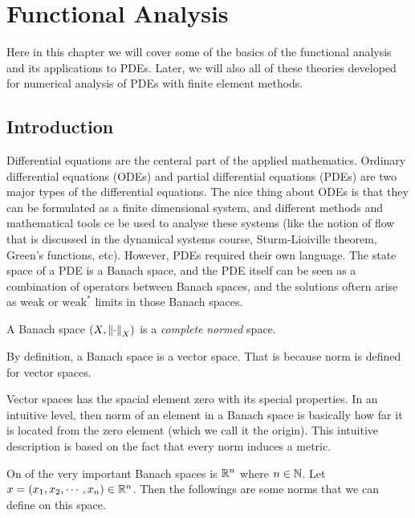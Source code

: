 
\chapter{Functional Analysis}

Here in this chapter we will cover some of the basics of the functional analysis and its applications to PDEs. Later, we will also all of these theories developed for numerical analysis of PDEs with finite element methods.



\section{Introduction}
Differential equations are the centeral part of the applied mathematics. Ordinary differential equations (ODEs) and partial differential equations (PDEs) are two major types of the differential equations. The nice thing about ODEs is that they can be formulated as a finite dimensional system, and different methods and mathematical tools ce be used to analyse these systems (like the notion of flow that is discussed in the dynamical systems course, Sturm-Lioiville theorem, Green's functions, etc). However, PDEs required their own language. The state space of a PDE is a Banach space, and the PDE itself can be seen as a combination of operators between Banach spaces, and the solutions oftern arise as weak or $ \text{weak}^* $ limits in those Banach spaces. 

\begin{definition}
  A Banach space $ (X, \norm{\cdot}_X) $ is a \emph{complete} \emph{normed} space.
\end{definition}

\begin{remark}
  By definition, a Banach space is a vector space. That is because norm is defined for vector spaces.
\end{remark}

\begin{remark}
  Vector spaces has the spacial element zero with its special properties. In an intuitive level, then norm of an element in a Banach space is basically how far it is located from the zero element (which we call it the origin). This intuitive description is based on the fact that every norm induces a metric.
\end{remark}

\begin{example}
  On of the very important Banach spaces is $ \mathbb{R}^n $ where $ n\in\mathbb{N} $. Let $ x = (x_{1}, x_{2}, \cdots, x_{n}) \in \mathbb{R}^n $. Then the followings are some norms that we can define on this space.
\end{example}

